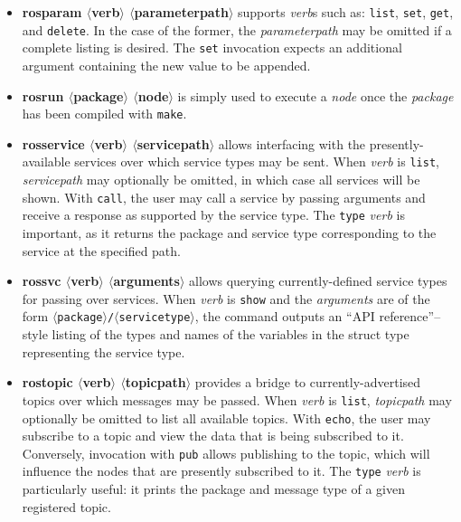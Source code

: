 \documentclass[12pt]{report}
\begin{document}
\begin{itemize}
\item{\textbf{rosparam $\langle$verb$\rangle$ $\langle$parameterpath$\rangle$} supports \textit{verb}s such as: \texttt{list}, \texttt{set}, \texttt{get}, and \texttt{delete}.  In the case of the former, the \textit{parameterpath} may be omitted if a complete listing is desired.  The \texttt{set} invocation expects an additional argument containing the new value to be appended.}
\item{\textbf{rosrun $\langle$package$\rangle$ $\langle$node$\rangle$} is simply used to execute a \textit{node} once the \textit{package} has been compiled with \texttt{make}.}
\item{\textbf{rosservice $\langle$verb$\rangle$ $\langle$servicepath$\rangle$} allows interfacing with the presently-available services over which service types may be sent.  When \textit{verb} is \texttt{list}, \textit{servicepath} may optionally be omitted, in which case all services will be shown.  With \texttt{call}, the user may call a service by passing arguments and receive a response as supported by the service type.  The \texttt{type} \textit{verb} is important, as it returns the package and service type corresponding to the service at the specified path.}
\item{\textbf{rossvc $\langle$verb$\rangle$ $\langle$arguments$\rangle$} allows querying currently-defined service types for passing over services.  When \textit{verb} is \texttt{show} and the \textit{arguments} are of the form \texttt{$\langle$package$\rangle$/$\langle$servicetype$\rangle$}, the command outputs an ``API reference''--style listing of the types and names of the variables in the struct type representing the service type.}
\item{\textbf{rostopic $\langle$verb$\rangle$ $\langle$topicpath$\rangle$} provides a bridge to currently-advertised topics over which messages may be passed.  When \textit{verb} is \texttt{list}, \textit{topicpath} may optionally be omitted to list all available topics.  With \texttt{echo}, the user may subscribe to a topic and view the data that is being subscribed to it.  Conversely, invocation with \texttt{pub} allows publishing to the topic, which will influence the nodes that are presently subscribed to it.  The \texttt{type} \textit{verb} is particularly useful: it prints the package and message type of a given registered topic.}
\end{itemize}
\end{document}
